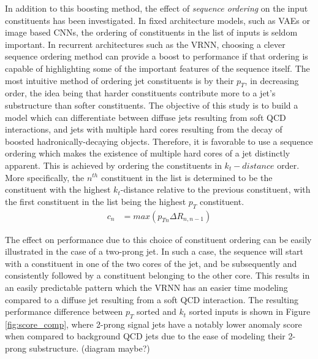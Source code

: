 \documentclass[12pt, a4paper]{article}
\begin{document}
In addition to this boosting method, the effect of \textit{sequence ordering} on the input constituents has been investigated. In fixed architecture models, such as VAEs or image based CNNs, the ordering of constituents in the list of inputs is seldom important. In recurrent architectures such as the VRNN, choosing a clever sequence ordering method can provide a boost to performance if that ordering is capable of highlighting some of the important features of the sequence itself. The most intuitive method of ordering jet constituents is by their $p_{T}$, in decreasing order, the idea being that harder constituents contribute more to a jet's substructure than softer constituents. The objective of this study is to build a model which can differentiate between diffuse jets resulting from soft QCD interactions, and jets with multiple hard cores resulting from the decay of boosted hadronically-decaying objects. Therefore, it is favorable to use a sequence ordering which makes the existence of multiple hard cores of a jet distinctly apparent. This is achieved by ordering the constituents in $k_{t}-distance$ order. More specifically, the $n^{th}$ constituent in the list is determined to be the constituent with the highest $k_{t}$-distance relative to the previous constituent, with the first constituent in the list being the highest $p_{T}$ constituent.
\begin{align*}
c_{n} &= max(p_{Tn}\Delta R_{n, n-1})
\end{align*}

The effect on performance due to this choice of constituent ordering can be easily illustrated in the case of a two-prong jet. In such a case, the sequence will start with a constituent in one of the two cores of the jet, and be subsequently and consistently followed by a constituent belonging to the other core. This results in an easily predictable pattern which the VRNN has an easier time modeling compared to a diffuse jet resulting from a soft QCD interaction. The resulting performance difference between $p_{T}$ sorted and $k_{t}$ sorted inputs is shown in Figure \ref{fig:score_comp}, where 2-prong signal jets have a notably lower anomaly score when compared to background QCD jets due to the ease of modeling their 2-prong substructure. (diagram maybe?)
\end{document}

